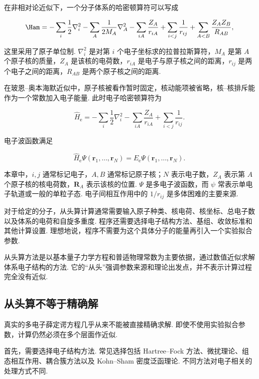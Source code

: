 \documentclass[UTF8,11pt,a4paper,openany]{ctexbook}
\begin{document}
在非相对论近似下，一个分子体系的哈密顿算符可以写成

\[
\Ham
=
-\sum_i \frac{1}{2}\nabla_i^2
-\sum_A \frac{1}{2M_A}\nabla_A^2
-\sum_{iA}\frac{Z_A}{r_{iA}}
+\sum_{i<j}\frac{1}{r_{ij}}
+\sum_{A<B}\frac{Z_AZ_B}{R_{AB}},
\]

这里采用了原子单位制. $\nabla_i^2$ 是对第 $i$ 个电子坐标求的拉普拉斯算符，$M_A$ 是第 $A$ 个原子核的质量，$Z_A$ 是该核的电荷数，$r_{iA}$ 是电子与原子核之间的距离，$r_{ij}$ 是两个电子之间的距离，$R_{AB}$ 是两个原子核之间的距离. 

在玻恩--奥本海默近似中，原子核被看作暂时固定，核动能项被省略，核--核排斥能作为一个常数加入电子能量. 此时电子哈密顿算符为

\[
\hat H_{\mathrm e}
=
-\sum_i \frac{1}{2}\nabla_i^2
-\sum_{iA}\frac{Z_A}{r_{iA}}
+\sum_{i<j}\frac{1}{r_{ij}}.
\]

电子波函数满足

\[
\hat H_{\mathrm e}\Psi(\mathbf r_1,\ldots,\mathbf r_N)
=
E_{\mathrm e}\Psi(\mathbf r_1,\ldots,\mathbf r_N).
\]

\begin{notationbox}
本章中，$i,j$ 通常标记电子，$A,B$ 通常标记原子核；$N$ 表示电子数，$Z_A$ 表示第 $A$ 个原子核的核电荷数，$\mathbf R_A$ 表示该核的位置. $\Psi$ 是多电子波函数，而 $\psi$ 常表示单电子轨道或一般的单粒子态. 电子间相互作用中的 $1/r_{ij}$ 是多体困难的主要来源. 
\end{notationbox}

对于给定的分子，从头算计算通常需要输入原子种类、核电荷、核坐标、总电子数以及体系的电荷和自旋多重度. 程序还需要选择电子结构方法、基组、收敛标准和其他计算设置. 理想地说，程序不需要为这个具体分子的能量再引入一个实验拟合参数. 

\begin{definitionbox}
从头算方法是以基本量子力学方程和普适物理常数为主要依据，通过数值近似求解体系电子结构的方法. 它的“从头”强调参数来源和理论出发点，并不表示计算过程完全没有近似. 
\end{definitionbox}

\subsection{从头算不等于精确解}

真实的多电子薛定谔方程几乎从来不能被直接精确求解. 即使不使用实验拟合参数，计算仍然必须在多个层面作近似. 

首先，需要选择电子结构方法. 常见选择包括 Hartree--Fock 方法、微扰理论、组态相互作用、耦合簇方法以及 Kohn--Sham 密度泛函理论. 不同方法对电子相关的处理方式不同. 
\end{document}
